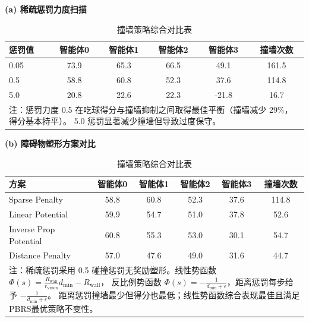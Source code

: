 \begin{table}[htbp]
  \centering
  \caption{ 撞墙策略综合对比表}
  \label{tab:appendix_wall_comprehensive}
  
  \textbf{(a) 稀疏惩罚力度扫描}
  \vspace{4pt}
  
  \begin{tabular}{lcccc|c}
    \toprule
    惩罚值 & 智能体0 & 智能体1 & 智能体2 & 智能体3 & 撞墙次数 \\
    \midrule
    0.05 & 73.9 & 65.3 & 66.5 & 49.1 & 161.5 \\
    0.5  & 58.8 & 60.8 & 52.3 & 37.6 & 114.8 \\
    5.0  & 20.8 & 22.6 & 22.3 & -21.8 & 16.7 \\
    \midrule
    \multicolumn{6}{p{0.85\textwidth}}{%
      \small 注：惩罚力度 0.5 在吃球得分与撞墙抑制之间取得最佳平衡（撞墙减少 29\%，得分基本持平）。
      5.0 惩罚显著减少撞墙但导致过度保守。} \\
    \bottomrule
  \end{tabular}
  
  \vspace{12pt}
  
  \textbf{(b) 障碍物塑形方案对比}
  \vspace{4pt}
  
  \begin{tabular}{lcccc|c}
    \toprule
    方案 & 智能体0 & 智能体1 & 智能体2 & 智能体3 & 撞墙次数 \\
    \midrule
    Sparse Penalty & 58.8 & 60.8 & 52.3 & 37.6 & 114.8 \\
    Linear Potential & 59.9 & 54.7 & 51.0 & 37.8 & 52.6 \\
    Inverse Prop Potential & 60.8 & 55.3 & 53.0 & 30.1 & 54.7 \\
    Distance Penalty & 57.0 & 47.6 & 49.0 & 31.6 & 44.7 \\
    \midrule
    \multicolumn{6}{p{0.85\textwidth}}{%
      \small 注：稀疏惩罚采用 0.5 碰撞惩罚无奖励塑形。线性势函数 $\Phi(s)=\frac{R_{\mathrm{wall}}}{r_{\mathrm{vision}}}d_{\min}-R_{\mathrm{wall}}$，
      反比例势函数 $\Phi(s)=-\frac{1}{d_{\min}+\epsilon}$，距离惩罚每步给予 $-\frac{1}{d_{\min}+\epsilon}$。
      距离惩罚撞墙最少但得分也最低；线性势函数综合表现最佳且满足PBRS最优策略不变性。} \\
    \bottomrule
  \end{tabular}
\end{table}



